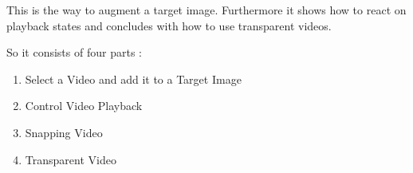 \documentclass{article}
\begin{document}

\par This is the way to augment a target image. Furthermore it shows how to react on playback states and concludes with how to use transparent videos. 
\par So it consists of four parts :
\begin{enumerate}
\item Select a Video and add it to a Target Image 
\item Control Video Playback 
\item  Snapping Video 
\item Transparent Video 
\end{enumerate}
\end{document}
